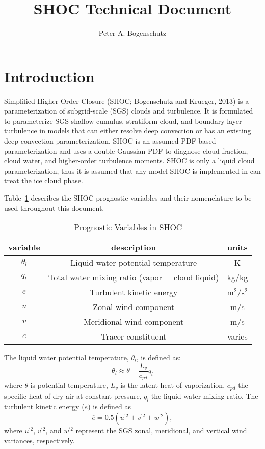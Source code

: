 \documentclass[12pt,titlepage]{article}
\title{SHOC Technical Document}
\author{Peter A. Bogenschutz}
\numberwithin{equation}{section}
\begin{document}
\maketitle 

\section{Introduction}

Simplified Higher Order Closure (SHOC; Bogenschutz and Krueger, 2013) is a parameterization of subgrid-scale (SGS) clouds and turbulence.  It is formulated to parameterize SGS shallow cumulus, stratiform cloud, and boundary layer turbulence in models that can either resolve deep convection or has an existing deep convection parameterization.  SHOC is an assumed-PDF based parameterization and uses a double Gaussian PDF to diagnose cloud fraction, cloud water, and higher-order turbulence moments.  SHOC is only a liquid cloud parameterization, thus it is assumed that any model SHOC is implemented in can treat the ice cloud phase. 

Table~\ref{table:prognostic} describes the SHOC prognostic variables and their nomenclature to be used throughout this document.  

\begin{table}[b]
\caption{Prognostic Variables in SHOC}
\centering
\begin{tabular}{c c c}
\hline\hline
variable & description & units \\
\hline
$\theta_{l}$ & Liquid water potential temperature & K \\
$q_{t}$ & Total water mixing ratio (vapor + cloud liquid) & kg/kg \\
$e$ & Turbulent kinetic energy & m$^2$/s$^2$ \\
$u$ & Zonal wind component & m/s \\
$v$ & Meridional wind component & m/s \\
$c$ & Tracer constituent & varies \\
\hline
\end{tabular}
\label{table:prognostic}
\end{table}

The liquid water potential temperature, $\theta_{l}$, is defined as:
%
\begin{equation}
  \theta_{l} \approx \theta - \frac{L_{v}}{c_{pd}}q_{l}
  \label{thetal}
\end{equation}
%
where $\theta$ is potential temperature, $L_{v}$ is the latent heat of vaporization, $c_{pd}$ the specific heat of dry air at constant pressure, $q_{l}$ the liquid water mixing ratio.  The turbulent kinetic energy ($\overline{e}$) is defined as
%
\begin{equation}
  \overline{e} = 0.5(\overline{u^{'2}}+\overline{v^{'2}}+\overline{w^{'2}}) , 
  \label{tke}
\end{equation}  
%
where $\overline{u^{'2}}$, $\overline{v^{'2}}$, and $\overline{w^{'2}}$ represent the SGS zonal, meridional, and vertical wind variances, respectively.  
\end{document}
